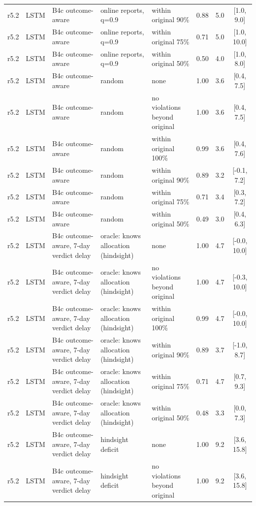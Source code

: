 \documentclass[10pt,onecolumn,letterpaper]{article}
\begin{document}
\begin{longtable}{lllp{4.2cm}p{3.4cm}ccc}
r5.2 & LSTM & B4c outcome-aware & online reports, q=0.9 & within original 90\% & 0.88 & 5.0 & [1.0, 9.0] \\
r5.2 & LSTM & B4c outcome-aware & online reports, q=0.9 & within original 75\% & 0.71 & 5.0 & [1.0, 10.0] \\
r5.2 & LSTM & B4c outcome-aware & online reports, q=0.9 & within original 50\% & 0.50 & 4.0 & [1.0, 8.0] \\
r5.2 & LSTM & B4c outcome-aware & random & none & 1.00 & 3.6 & [0.4, 7.5] \\
r5.2 & LSTM & B4c outcome-aware & random & no violations beyond original & 1.00 & 3.6 & [0.4, 7.5] \\
r5.2 & LSTM & B4c outcome-aware & random & within original 100\% & 0.99 & 3.6 & [0.4, 7.6] \\
r5.2 & LSTM & B4c outcome-aware & random & within original 90\% & 0.89 & 3.2 & [-0.1, 7.2] \\
r5.2 & LSTM & B4c outcome-aware & random & within original 75\% & 0.71 & 3.4 & [0.3, 7.2] \\
r5.2 & LSTM & B4c outcome-aware & random & within original 50\% & 0.49 & 3.0 & [0.4, 6.3] \\
r5.2 & LSTM & B4c outcome-aware, 7-day verdict delay & oracle: knows allocation (hindsight) & none & 1.00 & 4.7 & [-0.0, 10.0] \\
r5.2 & LSTM & B4c outcome-aware, 7-day verdict delay & oracle: knows allocation (hindsight) & no violations beyond original & 1.00 & 4.7 & [-0.3, 10.0] \\
r5.2 & LSTM & B4c outcome-aware, 7-day verdict delay & oracle: knows allocation (hindsight) & within original 100\% & 0.99 & 4.7 & [-0.0, 10.0] \\
r5.2 & LSTM & B4c outcome-aware, 7-day verdict delay & oracle: knows allocation (hindsight) & within original 90\% & 0.89 & 3.7 & [-1.0, 8.7] \\
r5.2 & LSTM & B4c outcome-aware, 7-day verdict delay & oracle: knows allocation (hindsight) & within original 75\% & 0.71 & 4.7 & [0.7, 9.3] \\
r5.2 & LSTM & B4c outcome-aware, 7-day verdict delay & oracle: knows allocation (hindsight) & within original 50\% & 0.48 & 3.3 & [0.0, 7.3] \\
r5.2 & LSTM & B4c outcome-aware, 7-day verdict delay & hindsight deficit & none & 1.00 & 9.2 & [3.6, 15.8] \\
r5.2 & LSTM & B4c outcome-aware, 7-day verdict delay & hindsight deficit & no violations beyond original & 1.00 & 9.2 & [3.6, 15.8] \\

\end{longtable}
\end{document}
